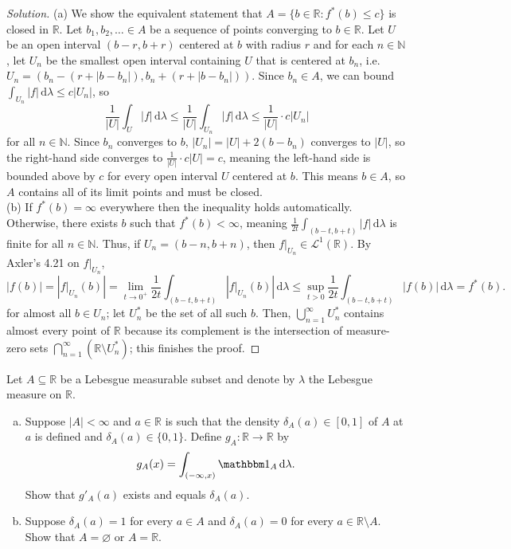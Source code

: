 \documentclass[10pt]{article}
\newcommand{\dd}{\,\mathrm{d}}
\providecommand{\NN}{\mathbb N}
\providecommand{\RR}{\mathbb R}
\providecommand{\ind}{\mathbbm 1}
\providecommand{\ii}{\item}
\newenvironment{soln}{\begin{proof}[Solution]}{\end{proof}}
\providecommand{\abs}[1]{\left\lvert #1\right\rvert}
\begin{document}
\begin{soln}
    (a) We show the equivalent statement that $A = \{b\in\RR : f^*(b) \le c\}$
    is closed in $\RR$. Let $b_1,b_2,\ldots\in A$ be a sequence of points
    converging to $b\in\RR$.
    Let $U$ be an open interval $(b-r,b+r)$ centered at $b$ with radius $r$
    and for each $n\in\NN$, let $U_n$ be the smallest open interval
    containing $U$ that is centered at $b_n$,
    i.e. $U_n = (b_n - (r + \abs{b - b_n}), b_n + (r + \abs{b - b_n}))$.
    Since $b_n\in A$, we can bound $\int_{U_n}\abs f\dd\lambda \le c\abs{U_n}$, so
    \begin{equation*}
	\frac 1{\abs U}\int_U\abs f\dd\lambda
	\le \frac 1{\abs U}\int_{U_n}\abs f\dd\lambda
	\le \frac 1{\abs U}\cdot c\abs{U_n}
    \end{equation*}
    for all $n\in\NN$. Since $b_n$ converges to $b$,
    $\abs{U_n} = \abs U + 2(b - b_n)$ converges to $\abs U$,
    so the right-hand side converges to $\frac 1{\abs U}\cdot c\abs U = c$,
    meaning the left-hand side is bounded above by $c$
    for every open interval $U$ centered at $b$.
    This means $b\in A$, so $A$ contains all of its limit points
    and must be closed.
    \\

    (b) If $f^*(b) = \infty$ everywhere then the inequality holds automatically.
    Otherwise, there exists $b$ such that $f^*(b) < \infty$, meaning
    $\frac 1{2t}\int_{(b-t,b+t)} \abs f\dd\lambda$
    is finite for all $n\in\NN$. Thus, if $U_n = (b - n, b + n)$,
    then $f|_{U_n}\in\mathcal L^1(\RR)$. By Axler's 4.21 on $f|_{U_n}$,
    \begin{equation*}
	\abs{f(b)} = \abs{f|_{U_n}(b)} =
	\lim_{t\to0^+}\frac 1{2t}\int_{(b-t,b+t)} \abs{f|_{U_n}(b)}\dd\lambda
	\le \sup_{t>0} \frac 1{2t}\int_{(b-t,b+t)} \abs{f(b)}\dd\lambda = f^*(b).
    \end{equation*}
    for almost all $b\in U_n$; let $U^*_n$ be the set of all such $b$.
    Then, $\bigcup_{n=1}^\infty U^*_n$ contains almost every point of $\RR$
    because its complement is the intersection of measure-zero sets
    $\bigcap_{n=1}^\infty (\RR\setminus U^*_n)$; this finishes the proof.
\end{soln}

\begin{problem}
    Let $A\subseteq\RR$ be a Lebesgue measurable subset
    and denote by $\lambda$ the Lebesgue measure on $\RR$.
    \begin{enumerate}[(a)]
        \ii Suppose $\abs A<\infty$ and $a\in\RR$ is such that
	the density $\delta_A(a)\in[0,1]$ of $A$ at $a$
	is defined and $\delta_A(a)\in\{0,1\}$. Define $g_A\colon\RR\to\RR$ by
	\begin{equation*}
	    g_A(x) = \int_{(-\infty,x)}\ind_A\dd\lambda.
	\end{equation*}
	Show that $g'_A(a)$ exists and equals $\delta_A(a)$.
	\ii Suppose $\delta_A(a) = 1$ for every $a\in A$ and
	$\delta_A(a) = 0$ for every $a\in\RR\setminus A$.
	Show that $A = \varnothing$ or $A = \RR$.
    \end{enumerate}
\end{problem}
\end{document}
